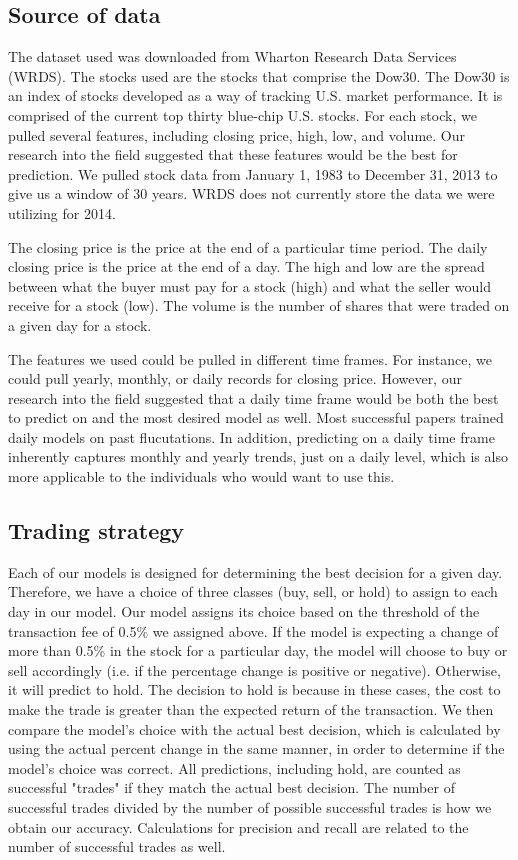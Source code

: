 \documentclass{article}
\begin{document}
\subsection{Source of data}
The dataset used was downloaded from Wharton Research Data Services (WRDS). The stocks used are the stocks that comprise the Dow30. The Dow30 is an index of stocks developed as a way of tracking U.S. market performance. It is comprised of the current top thirty blue-chip U.S. stocks. For each stock, we pulled several features, including closing price, high, low, and volume. Our research into the field suggested that these features would be the best for prediction. We pulled stock data from January 1, 1983 to December 31, 2013 to give us a window of 30 years. WRDS does not currently store the data we were utilizing for 2014.

The closing price is the price at the end of a particular time period. The daily closing price is the price at the end of a day. The high and low are the spread between what the buyer must pay for a stock (high) and what the seller would receive for a stock (low). The volume is the number of shares that were traded on a given day for a stock.

The features we used could be pulled in different time frames. For instance, we could pull yearly, monthly, or daily records for closing price. However, our research into the field suggested that a daily time frame would be both the best to predict on and the most desired model as well. Most successful papers trained daily models on past flucutations. In addition, predicting on a daily time frame inherently captures monthly and yearly trends, just on a daily level, which is also more applicable to the individuals who would want to use this.

\subsection{Trading strategy}
Each of our models is designed for determining the best decision for a given day. Therefore, we have a choice of three classes (buy, sell, or hold) to assign to each day in our model. Our model assigns its choice based on the threshold of the transaction fee of 0.5\% we assigned above. If the model is expecting a change of more than 0.5\% in the stock for a particular day, the model will choose to buy or sell accordingly (i.e. if the percentage change is positive or negative). Otherwise, it will predict to hold. The decision to hold is because in these cases, the cost to make the trade is greater than the expected return of the transaction. We then compare the model's choice with the actual best decision, which is calculated by using the actual percent change in the same manner, in order to determine if the model's choice was correct. All predictions, including hold, are counted as successful "trades" if they match the actual best decision. The number of successful trades divided by the number of possible successful trades is how we obtain our accuracy. Calculations for precision and recall are related to the number of successful trades as well.
\end{document}
